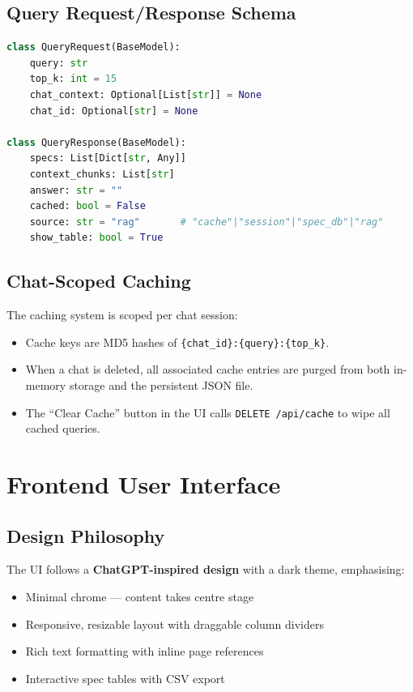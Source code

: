 \documentclass[12pt, a4paper]{article}
\begin{document}
\subsection{Query Request/Response Schema}

\begin{lstlisting}[language=Python, caption={Pydantic models for the query endpoint}]
class QueryRequest(BaseModel):
    query: str
    top_k: int = 15
    chat_context: Optional[List[str]] = None
    chat_id: Optional[str] = None

class QueryResponse(BaseModel):
    specs: List[Dict[str, Any]]
    context_chunks: List[str]
    answer: str = ""
    cached: bool = False
    source: str = "rag"       # "cache"|"session"|"spec_db"|"rag"
    show_table: bool = True
\end{lstlisting}

\subsection{Chat-Scoped Caching}

The caching system is scoped per chat session:
\begin{itemize}[itemsep=2pt]
  \item Cache keys are MD5 hashes of \texttt{\{chat\_id\}:\{query\}:\{top\_k\}}.
  \item When a chat is deleted, all associated cache entries are purged from both in-memory storage and the persistent JSON file.
  \item The ``Clear Cache'' button in the UI calls \texttt{DELETE /api/cache} to wipe all cached queries.
\end{itemize}

\section{Frontend User Interface}

\subsection{Design Philosophy}

The UI follows a \textbf{ChatGPT-inspired design} with a dark theme, emphasising:
\begin{itemize}[itemsep=2pt]
  \item Minimal chrome — content takes centre stage
  \item Responsive, resizable layout with draggable column dividers
  \item Rich text formatting with inline page references
  \item Interactive spec tables with CSV export
\end{itemize}
\end{document}
